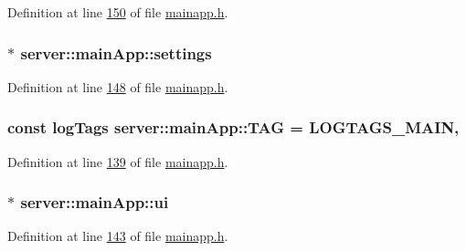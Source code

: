 Definition at line \hyperlink{mainapp_8h_source_l00150}{150} of file \hyperlink{mainapp_8h_source}{mainapp.\-h}.

\hypertarget{classserver_1_1main_app_a5664d0e28cd8826e504098e13e3c644a}{
\subsubsection[{settings}]{$\ast$ server\-::main\-App\-::settings\hspace{0.3cm}{\ttfamily [private]}}}\label{d1/d48/classserver_1_1main_app_a5664d0e28cd8826e504098e13e3c644a}


Definition at line \hyperlink{mainapp_8h_source_l00148}{148} of file \hyperlink{mainapp_8h_source}{mainapp.\-h}.

\hypertarget{classserver_1_1main_app_aed05f9dc959d800c4d641c31185e3693}{
\subsubsection[{T\-A\-G}]{\setlength{\rightskip}{0pt plus 5cm}const {\bf log\-Tags} server\-::main\-App\-::\-T\-A\-G = L\-O\-G\-T\-A\-G\-S\-\_\-\-M\-A\-I\-N\hspace{0.3cm}{\ttfamily [static]}, {\ttfamily [private]}}}\label{d1/d48/classserver_1_1main_app_aed05f9dc959d800c4d641c31185e3693}


Definition at line \hyperlink{mainapp_8h_source_l00139}{139} of file \hyperlink{mainapp_8h_source}{mainapp.\-h}.

\hypertarget{classserver_1_1main_app_a79270f76b62ff1a9d89c61a85978df94}{
\subsubsection[{ui}]{$\ast$ server\-::main\-App\-::ui\hspace{0.3cm}{\ttfamily [private]}}}\label{d1/d48/classserver_1_1main_app_a79270f76b62ff1a9d89c61a85978df94}


Definition at line \hyperlink{mainapp_8h_source_l00143}{143} of file \hyperlink{mainapp_8h_source}{mainapp.\-h}.

